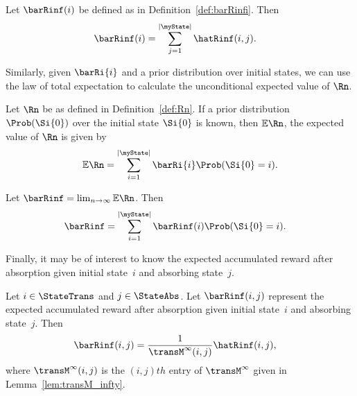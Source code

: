 \begin{mycor}
\label{cor:barRinfi}
	Let $\barRinf(i)$ be defined as in Definition~\ref{def:barRinfi}.  Then
\begin{align}
	\barRinf(i) &=  \sum_{j = 1}^{|\myState|} \hatRinf(i, j).
\end{align}	
\end{mycor}

Similarly, given $\barRi{i}$ and a prior distribution over initial states, we can use the law of total expectation to calculate the unconditional expected value of $\Rn$. 

\begin{theorem}
\label{thm:barR_prior}
	Let $\Rn$ be as defined in Definition~\ref{def:Rn}. If a prior distribution $\Prob(\Si{0})$ over the initial state $\Si{0}$ is known, then $\mathbb{E}\Rn$, the expected value of $\Rn$ is given by
	\begin{equation}
		\mathbb{E}\Rn = \sum_{i = 1}^{|\myState|} \barRi{i} \Prob(\Si{0} = i).
	\end{equation}
\end{theorem}
\begin{mycor}
	Let $\barRinf = \lim_{n \to \infty} \mathbb{E}\Rn$.  Then 
\label{cor:barRinf}
\begin{align}
	\barRinf &=  \sum_{i= 1}^{|\myState|} \barRinf(i)\Prob(\Si{0} = i).
\end{align}	
\end{mycor}

Finally, it may be of interest to know the expected accumulated reward after absorption given initial state~$i$ and absorbing state~$j$.

\begin{theorem}
\label{thm:barRinf_absorb}
	Let $i \in \StateTrans$ and $j \in \StateAbs$.  Let $\barRinf(i, j)$ represent the expected accumulated reward after absorption given initial state~$i$ and absorbing state~$j$.  Then 
	\begin{align}
		\barRinf(i, j) &=  \frac{1}{\transM^{\infty}(i, j)}\hatRinf(i, j), 
	\end{align}
	where $\transM^{\infty}(i, j)$ is the $(i, j)th$ entry of $\transM^{\infty}$ given in Lemma~\ref{lem:transM_infty}.
\end{theorem}
